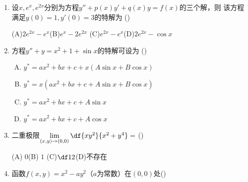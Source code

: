 \begin{enumerate}
  \item 设$x,e^x,e^{2x}$分别为方程$y''+p(x)y'+q(x)y=f(x)$的三个解，则
  该方程满足$y(0)=1,y'(0)=3$的特解为
  (\underline{\hspace{1cm}})
  
  (A)$2e^{2x}-e^x$\hspace{1cm}(B)$e^x-2e^{2x}$ \hspace{1cm}
  (C)$e^{2x}-e^x$\hspace{1cm}(D)$2e^{2x}-\cos x$
  \item 方程$y''+y=x^2+1+\sin x$的特解可设为
  (\underline{\hspace{1cm}})
  \begin{enumerate}[(A)]
    \item $y^*=ax^2+bx+c+x(A\sin x+B\cos x)$
    \item $y^*=x(ax^2+bx+c+A\sin x+B\cos x)$
    \item $y^*=ax^2+bx+c+A\sin x$
    \item $y^*=ax^2+bx+c+A\cos x$
  \end{enumerate}
  \item 二重极限$\lim\limits_{(x,y)\to(0,0)}\df{xy^2}{x^2+y^4}=$
  (\underline{\hspace{1cm}})
  
  (A) $0$\hspace{1cm}(B) $1$  \hspace{1cm}(C)$\df12$\hspace{1cm}(D)不存在
  \item 函数$f(x,y)=x^2-ay^2$（$a$为常数）在$(0,0)$处(\underline{\hspace{1cm}})
  

\end{enumerate}
